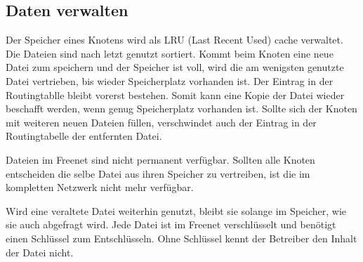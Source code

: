 \subsection{Daten verwalten}
Der Speicher eines Knotens wird als LRU (Last Recent Used) cache verwaltet.
Die Dateien sind nach letzt genutzt sortiert. Kommt beim Knoten eine neue Datei
zum speichern und der Speicher ist voll, wird die am wenigsten genutzte Datei
vertrieben, bis wieder Speicherplatz vorhanden ist. Der Eintrag in der
Routingtablle bleibt vorerst bestehen. Somit kann eine Kopie der Datei
wieder beschafft werden, wenn genug Speicherplatz vorhanden ist. Sollte sich
der Knoten mit weiteren neuen Dateien füllen, verschwindet auch der Eintrag
in der Routingtabelle der entfernten Datei.

Dateien im Freenet sind nicht permanent verfügbar. Sollten alle Knoten
entscheiden die selbe Datei aus ihren Speicher zu vertreiben, ist die im
kompletten Netzwerk nicht mehr verfügbar.

Wird eine veraltete Datei weiterhin genutzt, bleibt sie solange im Speicher,
wie sie auch abgefragt wird. Jede Datei ist im Freenet verschlüsselt und
benötigt einen Schlüssel zum Entschlüsseln.
Ohne Schlüssel kennt der Betreiber den Inhalt der Datei nicht.
